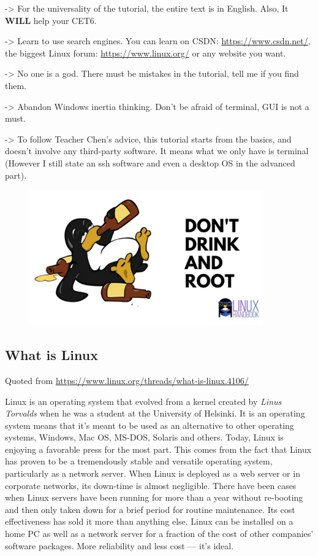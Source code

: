 \documentclass[12pt]{ctexart}
\newenvironment{mdquote}
{%
  \par\noindent
  \begin{list}{}{%
      \setlength{\leftmargin}{1em}%
      \setlength{\rightmargin}{0pt}%
      \setlength{\itemindent}{0pt}%
      \setlength{\listparindent}{\parindent}%
      \setlength{\topsep}{0.5\baselineskip}%
  }
  \item[\textbf{>}\ ]\itshape
}
{\end{list}\par}
\begin{document}
-> For the universality of the tutorial, the entire text is in English.
Also, It \textbf{WILL} help your CET6.

-> Learn to use search engines. You can learn on CSDN: 
\url{https://www.csdn.net/}, the biggest Linux forum: 
\url{https://www.linux.org/} or any website you want.

-> No one is a god. There must be mistakes in the tutorial, tell me if
you find them.

-> Abandon Windows inertia thinking. Don't be afraid of
terminal, GUI is not a must.

-> To follow Teacher Chen's advice, this tutorial starts
from the basics, and doesn't involve any third-party
software. It means what we only have is terminal (However I still state
an ssh software and even a desktop OS in the advanced part).

\begin{figure}[H]
    \centering
    \includegraphics[width=0.9\textwidth,keepaspectratio]{assets/Linux/Hello Linux!/1.png}
\end{figure}

\subsection*{\textbf{What is Linux}}

Quoted from \url{https://www.linux.org/threads/what-is-linux.4106/}

\begin{mdquote}
Linux is an operating system that evolved from a kernel created by
\emph{Linus Torvalds} when he was a student at the University of
Helsinki. It is an operating system means that it's
meant to be used as an alternative to other operating systems, Windows,
Mac OS, MS-DOS, Solaris and others. 
Today, Linux is enjoying a favorable press for the most part. This comes
from the fact that Linux has proven to be a tremendously stable and
versatile operating system, particularly as a network server. When Linux
is deployed as a web server or in corporate networks, its down-time is
almost negligible. There have been cases when Linux servers have been
running for more than a year without re-booting and then only taken down
for a brief period for routine maintenance. Its cost effectiveness has
sold it more than anything else. Linux can be installed on a home PC as
well as a network server for a fraction of the cost of other
companies' software packages. More reliability and less
cost --- it's ideal.
\end{mdquote}
\end{document}
